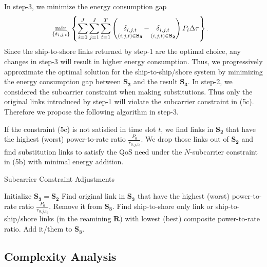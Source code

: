 \documentclass[conference]{IEEEtran}
\begin{document}
 In step-3, we minimize the energy consumption gap 
 \begin{align}
   &\mathop {\min }\limits_{\left\{ {{\delta _{i,j,t}}} \right\}} \left\{ {\sum\limits_{i = 0}^J {\sum\limits_{j = 1}^J {\sum\limits_{t = 1}^T {\left( {\mathop {{\delta _{i,j,t}}}\limits_{\left( {i,j,t} \right) \in {{\bf{S}}_{\bf{3}}}}  - \mathop {{\delta _{i,j,t}}}\limits_{\left( {i,j,t} \right) \in {{\bf{S}}_{\bf{2}}}} } \right){P_i}\Delta \tau } } } } \right\}.
 \end{align}
 Since the ship-to-shore links returned by step-1 are the optimal choice, any changes in step-3 will result in higher energy consumption. Thus, we progressively approximate the optimal solution for the ship-to-ship/shore system by minimizing the energy consumption gap between ${{\mathbf{S}}_{\mathbf{2}}}$ and the result ${{\mathbf{S}}_{\mathbf{3}}}$. 
 In step-2, we considered the subcarrier constraint when making substitutions. Thus only the original links introduced by step-1 will violate the subcarrier constraint in (5c). Therefore we propose the following algorithm in step-3.
 
 If the constraint (5c) is not satisfied in time slot ${t}$, we find links in ${{\mathbf{S}}_{\mathbf{2}}}$ that have the highest (worst) power-to-rate ratio ${\frac{P_0}{r_{0,j,{t_0}}}}$. We drop those links out of ${{\mathbf{S}}_{\mathbf{2}}}$ and find substitution links to satisfy the QoS need under the $N$-subcarrier constraint in (5b) with minimal energy addition. 
 
 \begin{algorithm}[ht]
 \caption{Subcarrier Constraint Adjustments}
 \begin{algorithmic}[1]
 \STATE Initialize ${{\mathbf{S}}_{\mathbf{3}}}={{\mathbf{S}}_{\mathbf{2}}}$
   \STATE Find original link in ${{\mathbf{S}}_{\mathbf{3}}}$ that have the highest (worst) power-to-rate ratio ${\frac{P_0}{r_{0,j,{t_0}}}}$. 
   \STATE Remove it from ${{\mathbf{S}}_{\mathbf{3}}}$.
    \STATE Find ship-to-shore only link or ship-to-ship/shore links (in the reamining ${\mathbf{R}}$) with lowest (best) composite power-to-rate ratio. 
    \STATE Add it/them to ${{\mathbf{S}}_{\mathbf{3}}}$.
   \ENDWHILE
  \ENDIF
 \ENDFOR
 \end{algorithmic}
 \end{algorithm}

 \subsection{Complexity Analysis}
\end{document}

